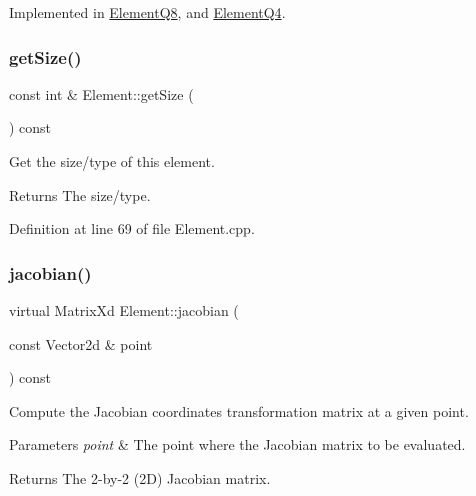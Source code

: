 Implemented in \mbox{\hyperlink{class_element_q8_a06118e8d0c0a0cb247c249f22e11eeaf}{Element\+Q8}}, and \mbox{\hyperlink{class_element_q4_a3e2b762e838f20a10c184f55d3d4ff85}{Element\+Q4}}.

\mbox{\label{class_element_a0221b246d9ca632136cc39790c46ee8f}} 
\subsubsection{\texorpdfstring{get\+Size()}{getSize()}}
{\footnotesize\ttfamily const int \& Element\+::get\+Size (\begin{DoxyParamCaption}{ }\end{DoxyParamCaption}) const}



Get the size/type of this element. 

\begin{DoxyReturn}{Returns}
The size/type. 
\end{DoxyReturn}


Definition at line 69 of file Element.\+cpp.

\mbox{\label{class_element_ad469c745f0bcb9d7a3431b1608c1ade6}} 
\subsubsection{\texorpdfstring{jacobian()}{jacobian()}}
{\footnotesize\ttfamily virtual Matrix\+Xd Element\+::jacobian (\begin{DoxyParamCaption}\item[{const Vector2d \&}]{point }\end{DoxyParamCaption}) const\hspace{0.3cm}{\ttfamily [pure virtual]}}



Compute the Jacobian coordinates transformation matrix at a given point. 


\begin{DoxyParams}{Parameters}
{\em point} & The point where the Jacobian matrix to be evaluated. \\
\hline
\end{DoxyParams}
\begin{DoxyReturn}{Returns}
The 2-\/by-\/2 (2D) Jacobian matrix. 
\end{DoxyReturn}


